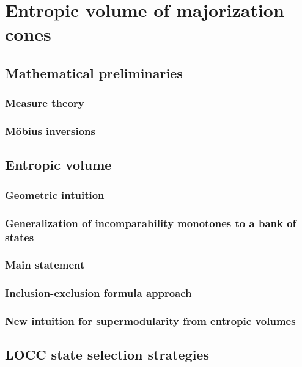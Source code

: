 \chapter{Entropic volume of majorization cones}

\section{Mathematical preliminaries}

\subsection{Measure theory}

\subsection{Möbius inversions}

\section{Entropic volume}

\subsection{Geometric intuition}

\subsection{Generalization of incomparability monotones to a bank of states}

\subsection{Main statement}

\subsection{Inclusion-exclusion formula approach}

\subsection{New intuition for supermodularity from entropic volumes}

\section{LOCC state selection strategies}

